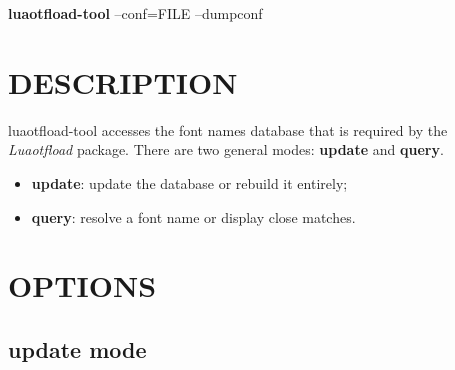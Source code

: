 \documentclass[a4paper]{article}
\begin{document}
\textbf{luaotfload-tool} --conf=FILE --dumpconf


\section{DESCRIPTION%
  \label{description}%
}

luaotfload-tool accesses the font names database that is required by
the \emph{Luaotfload} package. There are two general modes: \textbf{update} and
\textbf{query}.

\begin{itemize}
\item \textbf{update}:  update the database or rebuild it entirely;

\item \textbf{query}:   resolve a font name or display close matches.
\end{itemize}


\section{OPTIONS%
  \label{options}%
}


\subsection{update mode%
  \label{update-mode}%
}
\end{document}
